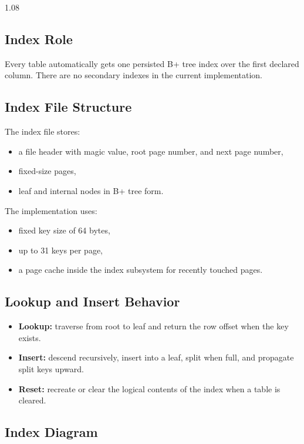 \documentclass[11pt,a4paper]{article}
\begin{document}
\begin{spacing}{1.08}
\subsection{Index Role}

Every table automatically gets one persisted B+ tree index over the first declared column. There are no secondary indexes in the current implementation.

\subsection{Index File Structure}

The index file stores:

\begin{itemize}
    \item a file header with magic value, root page number, and next page number,
    \item fixed-size pages,
    \item leaf and internal nodes in B+ tree form.
\end{itemize}

The implementation uses:

\begin{itemize}
    \item fixed key size of 64 bytes,
    \item up to 31 keys per page,
    \item a page cache inside the index subsystem for recently touched pages.
\end{itemize}

\subsection{Lookup and Insert Behavior}

\begin{itemize}
    \item \textbf{Lookup:} traverse from root to leaf and return the row offset when the key exists.
    \item \textbf{Insert:} descend recursively, insert into a leaf, split when full, and propagate split keys upward.
    \item \textbf{Reset:} recreate or clear the logical contents of the index when a table is cleared.
\end{itemize}

\subsection{Index Diagram}


\end{spacing}
\end{document}
